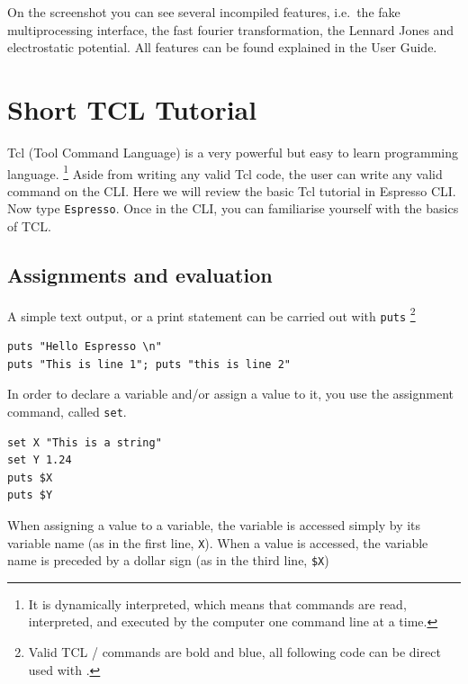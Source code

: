 \documentclass[
paper=a4,                       %
fontsize=11pt,                  %
twoside,                        %
footsepline,                    %
headsepline,                    %
headinclude=false,              %
footinclude=false,              %
pagesize,                       %
]{scrartcl}
\begin{document}
On the screenshot you can see several incompiled features, i.e.~the fake multiprocessing interface, the fast fourier transformation, the Lennard Jones and electrostatic potential. All features can be found explained in the \es{} User Guide.

 \section{Short TCL Tutorial}\label{sec:tcl}

   Tcl (Tool Command Language) is a very powerful but easy to learn programming
   language. \footnote{It is dynamically interpreted, which means that commands are read,
   interpreted, and executed by the computer one command line at a time.} 
   Aside from writing any valid Tcl code, the user can write any valid \es{}
   command on the \es{} CLI. Here we will review the 
   basic Tcl tutorial \cite{tcl_tut_url} in Espresso CLI. Now type 
   \texttt{Espresso}. Once in the CLI, you can familiarise yourself with the 
   basics of TCL. 
   
    \subsection{Assignments and evaluation}
     A simple text output, or a print statement can be carried out with 
     \lstinline|puts| \footnote{Valid TCL / \es{} commands are bold and blue, all following code can be direct used with \es{}.}
      

{\vspace{0,2cm}\small
\begin{lstlisting}[numbers=none]
puts "Hello Espresso \n"
puts "This is line 1"; puts "this is line 2"
\end{lstlisting}\vspace{0,2cm}
}

\noindent In order to declare a variable and/or assign a value to it, you use the
assignment command, called \lstinline|set|.

{\small\vspace{0,2cm}
\begin{lstlisting}[numbers=none]
set X "This is a string"
set Y 1.24
puts $X
puts $Y
\end{lstlisting}\vspace{0,2cm}
} 

\noindent When assigning a value to a variable, the variable is accessed simply by its
variable name (as in the first line, \texttt{X}). When a value is accessed, the variable
name is preceded by a dollar sign (as in the third line, \texttt{\$X})
\end{document}

